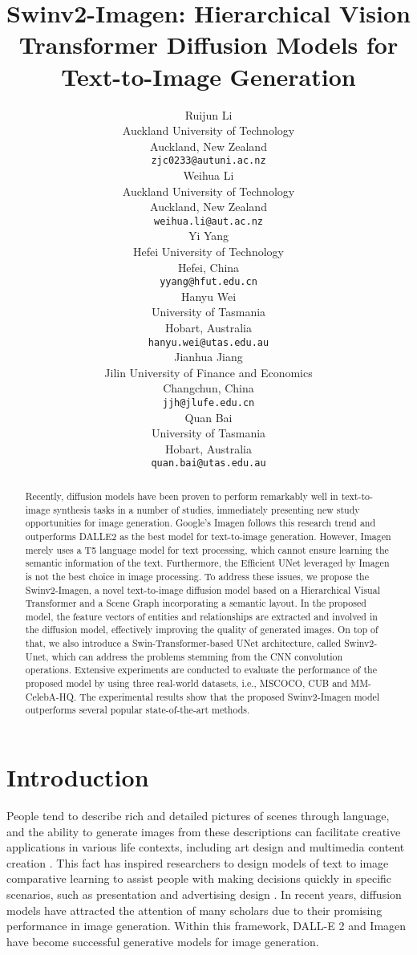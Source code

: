 \documentclass{article}
\title{Swinv2-Imagen: Hierarchical Vision Transformer Diffusion Models
for Text-to-Image Generation
}
\author{
  Ruijun Li \\
  Auckland University of Technology \\
  Auckland, New Zealand\\
  \texttt{zjc0233@autuni.ac.nz} \\
\And
  Weihua Li \\
  Auckland University of Technology \\
  Auckland, New Zealand\\
  \texttt{weihua.li@aut.ac.nz} \\
  \And
  Yi Yang \\
  Hefei University of Technology \\
  Hefei, China \\
  \texttt{yyang@hfut.edu.cn} \\
  \And
  Hanyu Wei \\
  University of Tasmania \\
  Hobart, Australia \\
  \texttt{hanyu.wei@utas.edu.au} \\
  \And
  Jianhua Jiang \\
  Jilin University of Finance and Economics \\
  Changchun, China \\
  \texttt{jjh@jlufe.edu.cn} \\
  \And
  Quan Bai \\
  University of Tasmania \\
  Hobart, Australia \\
  \texttt{quan.bai@utas.edu.au} \\
}
\begin{document}
\maketitle


\begin{abstract}
Recently, diffusion models have been proven to perform remarkably well in text-to-image synthesis tasks in a number of studies, immediately presenting new study opportunities for image generation. Google's Imagen follows this research trend and outperforms DALLE2 as the best model for text-to-image generation. However, Imagen merely uses a T5 language model for text processing, which cannot ensure 
learning the semantic information of the text. Furthermore, the Efficient UNet leveraged by Imagen is not the best choice in image processing. To address these issues, we propose the Swinv2-Imagen, a novel text-to-image diffusion model based on a Hierarchical Visual Transformer and a Scene Graph incorporating a semantic layout. In the proposed model, the feature vectors of entities and relationships are extracted and involved in the diffusion model, effectively improving the quality of generated images. On top of that, we also introduce a Swin-Transformer-based UNet architecture, called Swinv2-Unet, which can address the problems stemming from the CNN convolution operations. Extensive experiments are conducted to evaluate the performance of the proposed model by using three real-world datasets, i.e., MSCOCO, CUB and MM-CelebA-HQ. The experimental results show that the proposed Swinv2-Imagen model outperforms several popular state-of-the-art methods.
\end{abstract}




\section{Introduction}
People tend to describe rich and detailed pictures of scenes through language, and the ability to generate images from these descriptions can facilitate creative applications in various life contexts, including art design and multimedia content creation \cite{kim2020tivgan,li2020exploring}. This fact has inspired researchers to design  models of text to image comparative learning to assist people with making decisions quickly in specific scenarios, such as presentation and advertising design \cite{mathesul2021attngan,Park2021BenchmarkFC}. In recent years, diffusion models have attracted the attention of many scholars due to their promising performance in image generation. Within this framework, DALL-E 2 \cite{Ramesh2022HierarchicalTI} and Imagen \cite{Saharia2022PhotorealisticTD} have become successful generative models for image generation. 
\end{document}
